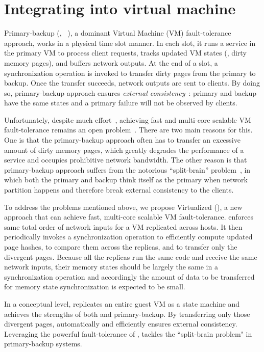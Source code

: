 \section{Integrating \xxx into virtual machine} \label{sec:vm-integration}

Primary-backup (\eg, \remus~\cite{remus:nsdi08}), a dominant Virtual Machine 
(VM) fault-tolerance approach, works in a physical time slot manner. In each 
slot, it runs a service in the primary VM to process client requests, tracks 
updated VM states (\eg, dirty memory pages), and buffers network outputs. 
At the end of a slot, a synchronization operation is invoked to transfer dirty 
pages from the primary to backup. Once the transfer succeeds, network outputs 
are sent to clients. By doing so, primary-backup approach ensures 
\emph{external consistency}~\cite{remus:nsdi08}: primary and backup have the 
same states and a primary failure will not be observed by clients.

Unfortunately, despite much effort~\cite{remus:nsdi08,qemu-mc, 
sartakov2017multi,lu2012speculative, gerofi2011rdma}, achieving fast and 
multi-core scalable VM fault-tolerance remains an open 
problem~\cite{dong2013colo,gerofi2011rdma,sartakov2017multi}. There are two main 
reasons for this. One is that the primary-backup approach often has to transfer 
an excessive amount of dirty memory pages, which greatly degrades the 
performance of a service and occupies prohibitive network bandwidth. The other 
reason is that primary-backup approach suffers from the notorious 
``split-brain'' problem~\cite{scales2010design}, in which both the primary and 
backup think itself as the primary when network partition happens and 
therefore break external consistency to the clients.

To address the problems mentioned above, we propose Virtualized \smr (\vsmr), a 
new \smr approach that can achieve fast, multi-core scalable VM fault-tolerance. 
\vsmr enforces same total order of network inputs for a VM replicated across 
hosts. It then periodically invokes a synchronization operation to efficiently 
compute updated page hashes, to compare them across the replicas, and to 
transfer only the divergent pages. Because all the replicas run the same 
code and receive the same network inputs, their memory states should be 
largely the same in a synchronization operation and accordingly the amount of 
data to be transferred for memory state synchronization is expected to be small.

In a conceptual level, \vsmr replicates an entire guest VM as a state machine 
and achieves the strengths of both \smr and primary-backup. By transferring 
only those divergent pages, \vsmr automatically and efficiently ensures 
external consistency. Leveraging the powerful fault-tolerance of \paxos, \vsmr
tackles the ``split-brain problem" in primary-backup systems.

